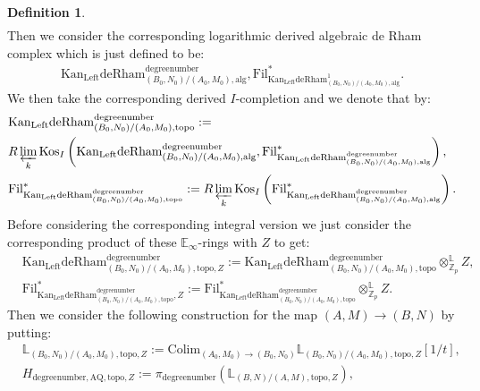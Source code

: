 \documentclass[11pt]{book}
\theoremstyle{definition}
\newtheorem{definition}[theorem]{Definition}
\numberwithin{equation}{section}
\begin{document}
\begin{definition}
\begin{align}
\end{align}
Then we consider the corresponding logarithmic derived algebraic de Rham complex which is just defined to be:
\begin{align}
\mathrm{Kan}_\mathrm{Left}\mathrm{deRham}^\text{degreenumber}_{(B_0,N_0)/(A_0,M_0),\mathrm{alg}},\mathrm{Fil}^*_{\mathrm{Kan}_\mathrm{Left}\mathrm{deRham}^1_{(B_0,N_0)/(A_0,M_0),\mathrm{alg}}}.	
\end{align}
We then take the corresponding derived $I$-completion and we denote that by:
\begin{align}
&\mathrm{Kan}_\mathrm{Left}\mathrm{deRham}^\text{degreenumber}_{(B_0,N_0)/(A_0,M_0),\mathrm{topo}}:=\\
&R\varprojlim_k\mathrm{Kos}_I\left(\mathrm{Kan}_\mathrm{Left}\mathrm{deRham}^\text{degreenumber}_{(B_0,N_0)/(A_0,M_0),\mathrm{alg}},\mathrm{Fil}^*_{\mathrm{Kan}_\mathrm{Left}\mathrm{deRham}^\text{degreenumber}_{(B_0,N_0)/(A_0,M_0),\mathrm{alg}}}\right),\\
&\mathrm{Fil}^*_{\mathrm{Kan}_\mathrm{Left}\mathrm{deRham}^\text{degreenumber}_{(B_0,N_0)/(A_0,M_0),\mathrm{topo}}}:=R\varprojlim_k\mathrm{Kos}_I\left(\mathrm{Fil}^*_{\mathrm{Kan}_\mathrm{Left}\mathrm{deRham}^\text{degreenumber}_{(B_0,N_0)/(A_0,M_0),\mathrm{alg}}}\right).	
\end{align}
Before considering the corresponding integral version we just consider the corresponding product of these $\mathbb{E}_\infty$-rings with $Z$ to get:
\begin{align}
&\mathrm{Kan}_\mathrm{Left}\mathrm{deRham}^\text{degreenumber}_{(B_0,N_0)/(A_0,M_0),\mathrm{topo},Z}:=\mathrm{Kan}_\mathrm{Left}\mathrm{deRham}^\text{degreenumber}_{(B_0,N_0)/(A_0,M_0),\mathrm{topo}}{\otimes}^\mathbb{L}_{\mathbb{Z}_p}Z,\\
&\mathrm{Fil}^*_{\mathrm{Kan}_\mathrm{Left}\mathrm{deRham}^\text{degreenumber}_{(B_0,N_0)/(A_0,M_0),\mathrm{topo}},Z}:=\mathrm{Fil}^*_{\mathrm{Kan}_\mathrm{Left}\mathrm{deRham}^\text{degreenumber}_{(B_0,N_0)/(A_0,M_0),\mathrm{topo}}}{\otimes}^\mathbb{L}_{\mathbb{Z}_p}Z.	
\end{align}
Then we consider the following construction for the map $(A,M)\rightarrow (B,N)$ by putting:
\begin{align}
&\mathbb{L}_{(B_0,N_0)/(A_0,M_0),\mathrm{topo},Z}:= \mathrm{Colim}_{(A_0,M_0)\rightarrow (B_0,N_0)}\mathbb{L}_{(B_0,N_0)/(A_0,M_0),\mathrm{topo},Z}[1/t],\\
&H_{\text{degreenumber},{\mathrm{AQ}},\mathrm{topo},Z}:=\pi_\text{degreenumber} (\mathbb{L}_{(B,N)/(A,M),\mathrm{topo},Z}),	\\

\end{align}
\end{definition}
\end{document}
